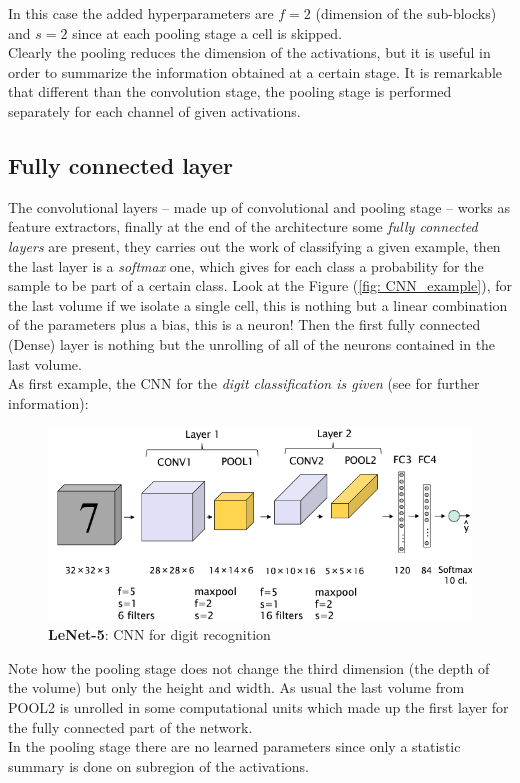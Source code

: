 In this case the added hyperparameters are $f=2$ (dimension of the sub-blocks) and $s=2$ since at each pooling stage a cell is skipped. \\
Clearly the pooling reduces the dimension of the activations, but it is useful in order to summarize the information obtained at a certain stage. It is remarkable that different than the convolution stage, the pooling stage is performed separately for each channel of given activations.

\subsection{Fully connected layer}
The convolutional layers -- made up of convolutional and pooling stage -- works as feature extractors, finally at the end of the architecture some \textit{fully connected layers} are present, they carries out the work of classifying a given example, then the last layer is a \textit{softmax} one, which gives for each class a probability for the sample to be part of a certain class. 
Look at the Figure (\ref{fig: CNN_example}), for the last  volume if we isolate a single cell, this is nothing but a linear combination of the parameters plus a bias, this is a neuron! Then the first fully connected (Dense) layer is nothing but the unrolling of all of the neurons contained in the last volume.\\

\noindent
As first example, the CNN for the \textit{digit classification is given} (see \cite{lenet5} for further information):

\begin{figure}
    \centering
    \includegraphics[scale=0.7]{img/LeNet_digit.png}
    \caption{\textbf{LeNet-5}: CNN for digit recognition}
\end{figure}
Note how the pooling stage does not change the third dimension (the depth of the volume) but only the height and width. As usual the last volume from POOL2 is unrolled in some computational units which made up the first layer for the fully connected part of the network. \\
In the pooling stage there are no learned parameters since only a statistic summary is done on subregion of the activations.

